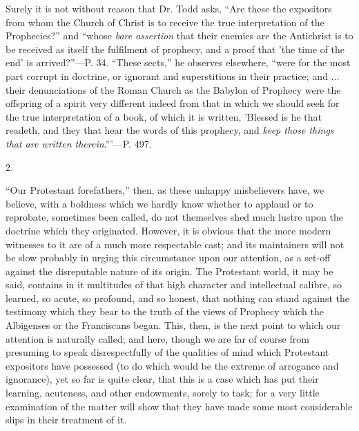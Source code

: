 Surely it is not without reason that Dr. Todd asks, ``Are these
the expositors from whom the Church of Christ is to receive the true
interpretation of the Prophecies?'' and ``whose \emph{bare
assertion} that their enemies are the Antichrist is to be received
as itself the fulfilment of prophecy, and a proof that 'the time of
the end' is arrived?''—P. 34. ``These sects,'' he
observes elsewhere, ``were for the most part corrupt in doctrine,
or ignorant and superstitious in their practice; and ... their
denunciations of the Roman Church as the Babylon of Prophecy were the
offspring of a spirit very different indeed from that in which we
should seek for the true interpretation of a book, of which it is
written, 'Blessed is he that readeth, and they that hear the words of
this prophecy, and \emph{keep those things that are written therein}.'''—P.
497.

2.

``Our Protestant forefathers,'' then, as these unhappy
misbelievers have, we believe, with a boldness which we hardly
know whether to applaud or to reprobate, sometimes been called, do not
themselves shed much lustre upon the doctrine which they originated.
However, it is obvious that the more modern witnesses to it are of a
much more respectable cast; and its maintainers will not be slow
probably in urging this circumstance upon our attention, as a set-off
against the disreputable nature of its origin. The Protestant world,
it may be said, contains in it multitudes of that high character and
intellectual calibre, so learned, so acute, so profound, and so
honest, that nothing can stand against the testimony which they bear
to the truth of the views of Prophecy which the Albigenses or the
Franciscans began. This, then, is the next point to which our
attention is naturally called; and here, though we are far of course
from presuming to speak disrespectfully of the qualities of mind which
Protestant expositors have possessed (to do which would be the extreme
of arrogance and ignorance), yet so far is quite clear, that this is a
case which has put their learning, acuteness, and other endowments,
sorely to task; for a very little examination of the matter will show
that they have made some most considerable slips in their treatment of
it.

